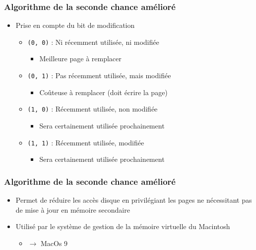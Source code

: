 \begin{frame}
\frametitle{Algorithme de la seconde chance amélioré}
\begin{itemize}
\item Prise en compte du bit de modification
\begin{itemize}
\item \texttt{(0, 0)} : Ni récemment utilisée, ni modifiée
\begin{itemize}
\item Meilleure page à remplacer
\end{itemize}
\item \texttt{(0, 1)} : Pas récemment utilisée, mais modifiée
\begin{itemize}
\item Coûteuse à remplacer (doit écrire la page)
\end{itemize}
\item \texttt{(1, 0)} : Récemment utilisée, non modifiée
\begin{itemize}
\item Sera certainement utilisée prochainement
\end{itemize}
\item \texttt{(1, 1)} : Récemment utilisée, modifiée
\begin{itemize}
\item Sera certainement utilisée prochainement
\end{itemize}
\end{itemize}
\end{itemize}
\end{frame}


\begin{frame}
\frametitle{Algorithme de la seconde chance amélioré}
\begin{itemize}
\item Permet de réduire les accès disque en privilégiant les pages ne nécessitant pas de mise à jour en mémoire secondaire
\item Utilisé par le système de gestion de la mémoire virtuelle du Macintosh
\begin{itemize}
\item $\rightarrow$ MacOs 9
\end{itemize}
\end{itemize}
\end{frame}



